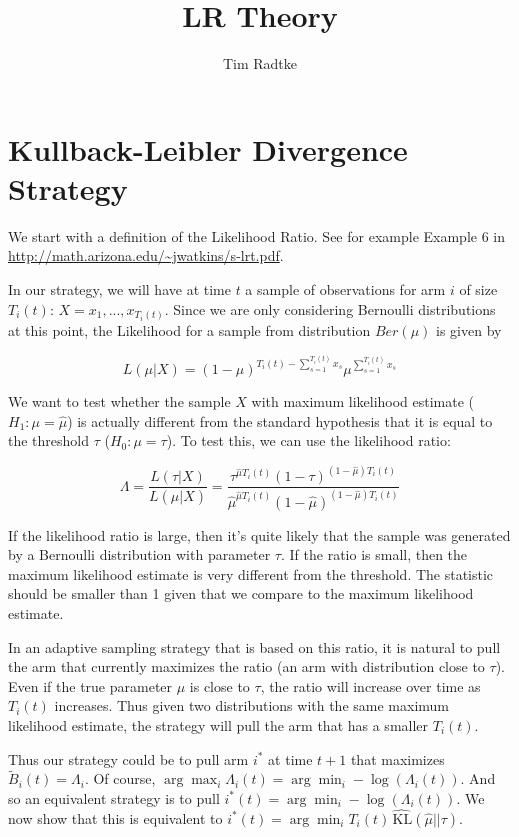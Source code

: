 \documentclass[12pt,]{article}
\title{LR Theory}
\author{Tim Radtke}
\date{}
\newcommand{\KL}{\,\text{KL}}
\begin{document}
\maketitle

\section{Kullback-Leibler Divergence
Strategy}\label{kullback-leibler-divergence-strategy}

We start with a definition of the Likelihood Ratio. See for example
Example 6 in \url{http://math.arizona.edu/~jwatkins/s-lrt.pdf}.

In our strategy, we will have at time \(t\) a sample of observations for
arm \(i\) of size \(T_i(t)\): \(X = x_1, ..., x_{T_i(t)}\). Since we are
only considering Bernoulli distributions at this point, the Likelihood
for a sample from distribution \(Ber(\mu)\) is given by

\[ 
L(\mu|X) = (1-\mu)^{T_i(t) - \sum_{s = 1}^{T_i(t)} x_s} \mu^{\sum_{s = 1}^{T_i(t)} x_s}
\]

We want to test whether the sample \(X\) with maximum likelihood
estimate (\(H_1: \mu = \hat{\mu}\)) is actually different from the
standard hypothesis that it is equal to the threshold \(\tau\)
(\(H_0: \mu = \tau\)). To test this, we can use the likelihood ratio:

\[
\Lambda = \frac{L(\tau|X)}{L(\hat{\mu}|X)} = \frac{\tau^{\hat{\mu}T_i(t)}(1-\tau)^{(1-\hat{\mu})T_i(t)} }{\hat{\mu}^{\hat{\mu}T_i(t)}(1-\hat{\mu})^{(1-\hat{\mu})T_i(t)}}
\]

If the likelihood ratio is large, then it's quite likely that the sample
was generated by a Bernoulli distribution with parameter \(\tau\). If
the ratio is small, then the maximum likelihood estimate is very
different from the threshold. The statistic should be smaller than 1
given that we compare to the maximum likelihood estimate.

In an adaptive sampling strategy that is based on this ratio, it is
natural to pull the arm that currently maximizes the ratio (an arm with
distribution close to \(\tau\)). Even if the true parameter \(\mu\) is
close to \(\tau\), the ratio will increase over time as \(T_i(t)\)
increases. Thus given two distributions with the same maximum likelihood
estimate, the strategy will pull the arm that has a smaller \(T_i(t)\).

Thus our strategy could be to pull arm \(i^*\) at time \(t+1\) that
maximizes \(\tilde{B}_i(t) = \Lambda_i\). Of course,
\(\arg \max_i \Lambda_i(t) = \arg \min_i -\log(\Lambda_i(t))\). And so
an equivalent strategy is to pull
\(i^*(t) = \arg \min_i -\log(\Lambda_i(t))\). We now show that this is
equivalent to \(i^*(t) = \arg \min_i T_i(t)\hat{\KL}(\hat{\mu}||\tau)\).
\end{document}
